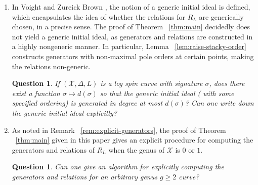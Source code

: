 \documentclass{amsart}
\theoremstyle{plain}
\newtheorem{question}[thm]{Question}
\theoremstyle{definition}
\theoremstyle{remark}
\numberwithin{equation}{section}
\newcommand \sx{\mathscr X}
\newcommand \di{\text{Div }}
\begin{document}
\begin{enumerate}
\begin{question}
\label{ques:fractional-weight}
If $\sx$ is a stacky curve and $D \in \di \sx$ with $nD \sim K,$ where $K$ is the canonical divisor of $\sx$, can one bound the degrees of generators and relations of $R_D$?
\end{question}
Note that that the above question is answered affirmatively in the case that $\sx$ has signature $(0;e_1,\ldots, e_r;\delta)$ in  . In fact, we show that if $D \in \di \sx$ so that $nD = K$ for some $n \geq 2$, then $R_D$ is generated in degree at most $e=\max(5,e_1,\ldots, e_r)$ with relations in degree at most $2e$. Additionally, Lemma ~\ref{lem:raise-stacky-order} naturally extends to the setting fractional weight modular forms, as noted in Remark ~\ref{rem:raise-fractional-order}.
	\item In Voight and Zureick Brown \cite[Definition 2.2.7]{vzb:stacky}, the notion of a generic initial ideal is defined, which encapsulates the idea of whether the relations for $R_L$ are generically chosen, in a precise sense. The proof of Theorem ~\ref{thm:main} decidedly does not yield a generic initial ideal, as generators and relations are constructed in a highly nongeneric manner. In particular, Lemma ~\ref{lem:raise-stacky-order} constructs generators with non-maximal pole orders at certain points, making the relations non-generic. 
\begin{question}
\label{ques:generic-initial}
If $(\sx,\Delta,L)$ is a log spin curve with signature $\sigma$, does there exist a function $\sigma \mapsto d(\sigma)$ so that the generic initial ideal {\rm(} with some specified ordering{\rm)} is generated in degree at most $d(\sigma)$? Can one write down the generic initial ideal explicitly?
\end{question}
	\item As noted in Remark ~\ref{rem:explicit-generators}, the proof of Theorem ~\ref{thm:main} given in this paper gives an explicit procedure for computing the generators and relations of $R_L$ when the genus of $\sx$ is $0$ or $1$.
\begin{question}
\label{ques:algorithm}
Can one give an algorithm for explicitly computing the generators and relations for an arbitrary genus $g \geq 2$ curve?
\end{question}

\end{enumerate}
\end{document}
